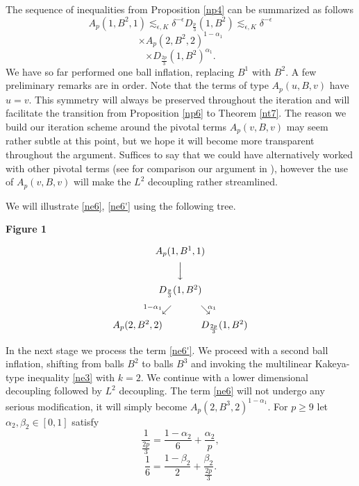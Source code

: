 \documentclass[amssymb,amsfonts,12pt]{amsart}
\begin{document}
The sequence of inequalities from Proposition \ref{np4} can be summarized as follows
$$A_p(1,B^2,1)\lesssim_{\epsilon,K}\delta^{-\epsilon} D_{\frac{p}{3}}(1,B^2)\lesssim_{\epsilon,K}\delta^{-\epsilon}$$
\begin{equation}
\label{ne6}
\times A_p(2,B^2,2)^{1-\alpha_1}
\end{equation}
\begin{equation}
\label{ne6'}
\times D_{\frac{2p}{3}}(1,B^2)^{\alpha_1}.
\end{equation}
We have so far performed one ball inflation, replacing $B^1$ with $B^2$. A few preliminary remarks are in order. Note that the terms of type $A_p(u,B,v)$ have $u=v$. This symmetry will always be preserved throughout the iteration and will facilitate the transition from Proposition \ref{np6} to Theorem \ref{nt7}. The reason we build our iteration scheme around the pivotal terms  $A_p(v,B,v)$ may seem rather subtle at this point, but we hope it will become more transparent throughout the argument. Suffices to say that we could have alternatively worked with other pivotal terms (see for comparison our argument in \cite{BD4}), however the use of $A_p(v,B,v)$ will make the $L^2$ decoupling rather streamlined.












\medskip



We will illustrate \eqref{ne6}, \eqref{ne6'}  using the following tree.

\bigskip

\centerline
{\bf Figure 1}
$$
\begin{CD}
A_p (1, B^1, 1)\\
 @VVV @.\\
D_{\frac p3} (1, B^2)\\
^{1-\alpha_1}\!\!\swarrow \qquad\quad \searrow^{\!\!\alpha_1}\\[-4pt]
A_p(2, B^2, 2) \qquad\qquad D_{\frac {2p}3} (1, B^2)
\end{CD}
$$
\medskip

In the next stage we process the term \eqref{ne6'}. We proceed with a second ball inflation, shifting from  balls $B^2$ to balls $B^3$ and invoking the multilinear Kakeya-type inequality \eqref{ne3} with $k=2$. We continue with a lower dimensional decoupling followed by $L^2$ decoupling.  The term \eqref{ne6} will not undergo any serious modification, it will simply become $A_p(2,B^3,2)^{1-\alpha_1}$.
For $p\ge 9$ let $\alpha_2,\beta_2\in [0,1]$ satisfy
$$\frac1{\frac{2p}3}=\frac{1-\alpha_2}{6}+\frac{\alpha_2}{p},$$
$$\frac16=\frac{1-\beta_2}2+\frac{\beta_2}{\frac{2p}3}.$$
\end{document}
